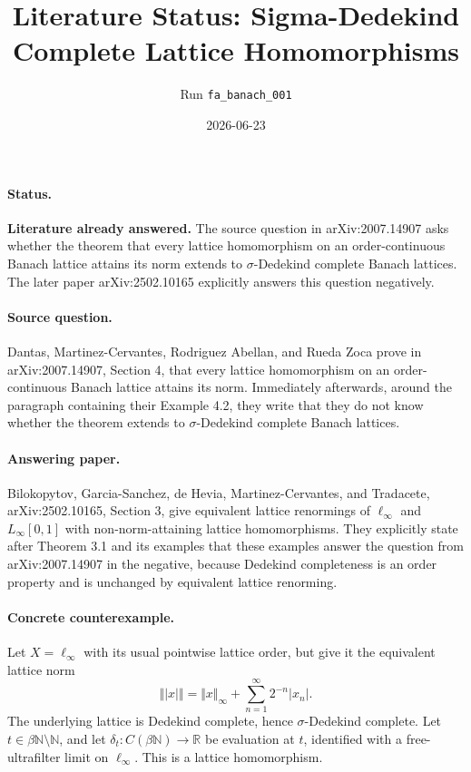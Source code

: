 \documentclass[11pt]{article}
\title{Literature Status: Sigma-Dedekind Complete Lattice Homomorphisms}
\author{Run \texttt{fa\_banach\_001}}
\date{2026-06-23}
\begin{document}
\maketitle

\paragraph{Status.}
\textbf{Literature already answered.}  The source question in
arXiv:2007.14907 asks whether the theorem that every lattice homomorphism on
an order-continuous Banach lattice attains its norm extends to
$\sigma$-Dedekind complete Banach lattices.  The later paper arXiv:2502.10165
explicitly answers this question negatively.

\paragraph{Source question.}
Dantas, Martinez-Cervantes, Rodriguez Abellan, and Rueda Zoca prove in
arXiv:2007.14907, Section 4, that every lattice homomorphism on an
order-continuous Banach lattice attains its norm.  Immediately afterwards,
around the paragraph containing their Example 4.2, they write that they do not
know whether the theorem extends to $\sigma$-Dedekind complete Banach lattices.

\paragraph{Answering paper.}
Bilokopytov, Garcia-Sanchez, de Hevia, Martinez-Cervantes, and Tradacete,
arXiv:2502.10165, Section 3, give equivalent lattice renormings of
$\ell_\infty$ and $L_\infty[0,1]$ with non-norm-attaining lattice
homomorphisms.  They explicitly state after Theorem 3.1 and its examples that
these examples answer the question from arXiv:2007.14907 in the negative,
because Dedekind completeness is an order property and is unchanged by
equivalent lattice renorming.

\paragraph{Concrete counterexample.}
Let $X=\ell_\infty$ with its usual pointwise lattice order, but give it the
equivalent lattice norm
\[
  \Vert\!\vert x\vert\!\Vert
  =
  \Vert x\Vert_\infty+\sum_{n=1}^\infty 2^{-n}|x_n|.
\]
The underlying lattice is Dedekind complete, hence $\sigma$-Dedekind complete.
Let $t\in\beta\mathbb N\setminus\mathbb N$, and let
$\delta_t\colon C(\beta\mathbb N)\to\mathbb R$ be evaluation at $t$, identified
with a free-ultrafilter limit on $\ell_\infty$.  This is a lattice
homomorphism.
\end{document}
